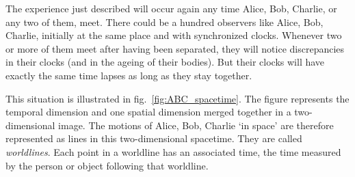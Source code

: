 \documentclass[a4paper,12pt,%
onecolumn,oneside,%
british%
]{memoir}
\renewcommand*{\|}[1][]{\nonscript\:#1\vert\nonscript\:\mathopen{}}
\newcommand*{\fig}{fig.}%
\begin{document}
The experience just described will occur again any time Alice, Bob, Charlie, or any two of them, meet. There could be a hundred observers like Alice, Bob, Charlie, initially at the same place and with synchronized clocks. Whenever two or more of them meet after having been separated, they will notice discrepancies in their clocks (and in the ageing of their bodies). But their clocks will have exactly the same time lapses as long as they stay together.

%
%
This situation is illustrated in \fig~\ref{fig:ABC_spacetime}. The figure represents the temporal dimension and one spatial dimension merged together in a two-dimensional image. The motions of Alice, Bob, Charlie \enquote*{in space} are therefore represented as lines in this two-dimensional spacetime. They are called \emph{worldlines}. Each point in a worldline has an associated time, the time measured by the person or object following that worldline.
\end{document}
